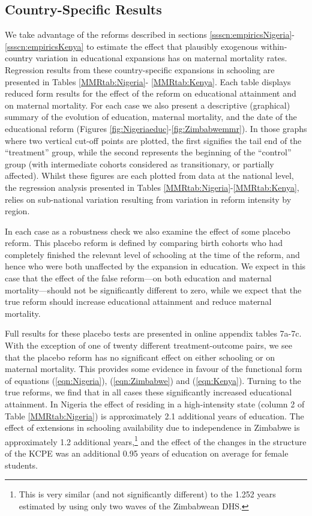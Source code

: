 \documentclass{article}[12pt,subeqn]
\begin{document}
\begin{spacing}{1.4}
\subsection{Country-Specific Results}
\label{sscn:casestudies}
We take advantage of the reforms described in sections
\ref{ssscn:empiricsNigeria}-\ref{ssscn:empiricsKenya} to estimate the effect that 
plausibly exogenous within-country variation in educational expansions has on 
maternal mortality rates. Regression results from these country-specific 
expansions in schooling are presented in Tables \ref{MMRtab:Nigeria}-%
\ref{MMRtab:Kenya}. Each table displays reduced form results for the effect of 
the reform on educational attainment and on maternal mortality. For each case we 
also present a descriptive (graphical) summary of the evolution of education, 
maternal mortality, and the date of the educational reform (Figures 
\ref{fig:Nigeriaeduc}-\ref{fig:Zimbabwemmr}). In those graphs where two vertical 
cut-off points are plotted, the first signifies the tail end of the ``treatment'' 
group, while the second represents the beginning of the ``control'' group (with 
intermediate cohorts considered as transitionary, or partially affected). Whilst 
these figures are each plotted from data at the national level, the regression 
analysis presented in Tables \ref{MMRtab:Nigeria}-\ref{MMRtab:Kenya}, relies on 
sub-national variation resulting from variation in reform intensity by region. 

In each case as a robustness check we also examine the effect of some placebo 
reform. This placebo reform is defined by comparing birth cohorts who had 
completely finished the relevant level of schooling at the time of the reform,
and hence who were both unaffected by the expansion in education.  We expect in
this case that the effect of the false reform---on both education and maternal 
mortality---should not be significantly different to zero, while we expect that 
the true reform should increase educational attainment and reduce maternal 
mortality.  

Full results for these placebo tests are presented in online appendix tables
7a-7c.  With the exception of one of twenty different treatment-outcome pairs,
we see that the placebo reform has no significant effect on either schooling
or on maternal mortality.  This provides some evidence in favour of the 
functional form of equations (\ref{eqn:Nigeria}), (\ref{eqn:Zimbabwe}) and 
(\ref{eqn:Kenya}). Turning to the true reforms, we find that in all cases these 
significantly increased educational attainment. In Nigeria the effect of residing 
in a high-intensity state (column 2 of Table \ref{MMRtab:Nigeria}) is approximately 
2.1 additional years of education.  The effect of extensions in schooling 
availability due to independence in Zimbabwe is approximately 1.2 additional 
years,\footnote{This is very similar (and not significantly different) to the 
1.252 years estimated by \citet{AgueroBharawadj2011} using only two waves of the 
Zimbabwean DHS.} and the effect of the changes in the structure of the KCPE was an 
additional 0.95 years of education on average for female students.


\end{spacing}
\end{document}
